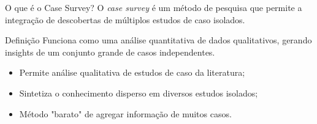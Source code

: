 \begin{frame}{O que é o Case Survey?}
    \justifying
    O \textit{case survey} é um método de pesquisa que permite a integração de descobertas de múltiplos estudos de caso isolados.

    \vspace{0.8em}
    \begin{block}{Definição}
        Funciona como uma análise quantitativa de dados qualitativos, gerando insights de um conjunto grande de casos independentes.
    \end{block}

    \vspace{0.8em}
    \begin{itemize}
        \item Permite análise qualitativa de estudos de caso da literatura;
        \item Sintetiza o conhecimento disperso em diversos estudos isolados;
        \item Método "barato" de agregar informação de muitos casos.
    \end{itemize}
\end{frame}